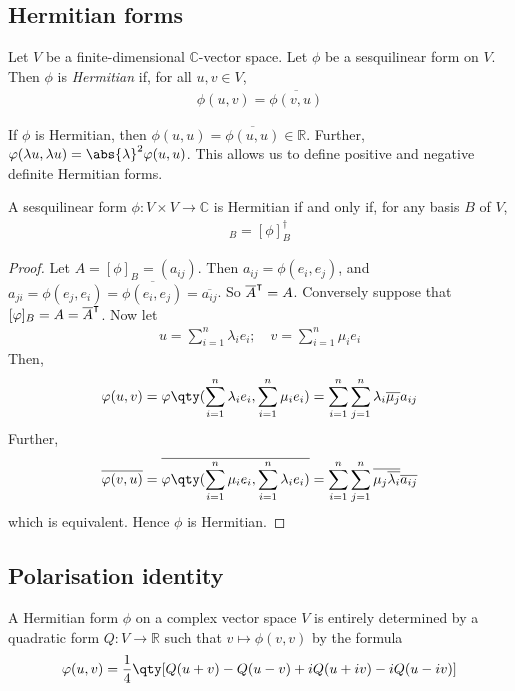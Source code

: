 \subsection{Hermitian forms}
\begin{definition}
	Let $V$ be a finite-dimensional $\mathbb C$-vector space.
	Let $\phi$ be a sesquilinear form on $V$.
	Then $\phi$ is \textit{Hermitian} if, for all $u, v \in V$,
	\begin{align*}
		\phi(u, v) = \overline{\phi(v,u)}
	\end{align*}
\end{definition}
\begin{remark}
	If $\phi$ is Hermitian, then $\phi(u,u) = \overline{\phi(u,u)} \in \mathbb R$.
	Further, $\phi(\lambda u, \lambda u) = \abs{\lambda}^2 \phi(u,u)$.
	This allows us to define positive and negative definite Hermitian forms.
\end{remark}
\begin{lemma}
	A sesquilinear form $\phi \colon V \times V \to \mathbb C$ is Hermitian if and only if, for any basis $B$ of $V$,
	\begin{align*}
		[\phi]_B = [\phi]_B^\dagger
	\end{align*}
\end{lemma}
\begin{proof}
	Let $A = [\phi]_B = (a_{ij})$.
	Then $a_{ij} = \phi(e_i, e_j)$, and $a_{ji} = \phi(e_j, e_i) = \overline{\phi(e_i, e_j)} = \overline{a_{ij}}$.
	So $\overline A^\intercal = A$.
	Conversely suppose that $[\varphi]_B = A = \overline A^\intercal$.
	Now let
	\begin{align*}
		u = \sum_{i=1}^n \lambda_i e_i;\quad v = \sum_{i=1}^n \mu_i e_i
	\end{align*}
	Then,
	\begin{align*}
		\phi(u,v) = \phi\qty(\sum_{i=1}^n \lambda_i e_i, \sum_{i=1}^n \mu_i e_i) = \sum_{i=1}^n \sum_{j=1}^n \lambda_i \overline{\mu_j} a_{ij}
	\end{align*}
	Further,
	\begin{align*}
		\overline{\phi(v,u)} = \overline{\phi\qty(\sum_{i=1}^n \mu_i e_i, \sum_{i=1}^n \lambda_i e_i)} = \sum_{i=1}^n \sum_{j=1}^n \overline{\mu_j \overline{\lambda_i}} \overline{a_{ij}}
	\end{align*}
	which is equivalent.
	Hence $\phi$ is Hermitian.
\end{proof}

\subsection{Polarisation identity}
A Hermitian form $\phi$ on a complex vector space $V$ is entirely determined by a quadratic form $Q \colon V \to \mathbb R$ such that $v \mapsto \phi(v,v)$ by the formula
\begin{align*}
	\phi(u,v) = \frac{1}{4} \qty[ Q(u+v) - Q(u-v) + iQ(u+iv) - iQ(u-iv) ]
\end{align*}


